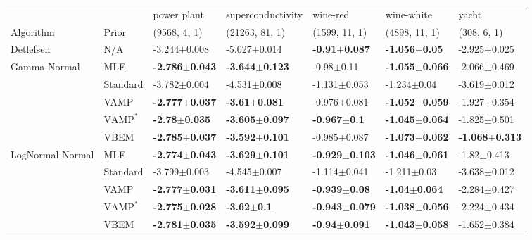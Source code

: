 \begin{tabular}{lllllll}
\midrule
                 &      &                power plant &          superconductivity &                   wine-red &                 wine-white &                      yacht \\
Algorithm & Prior& (9568, 4, 1)& (21263, 81, 1)& (1599, 11, 1)& (4898, 11, 1)& (308, 6, 1)\\
\midrule
Detlefsen & N/A &           -3.244$\pm$0.008 &           -5.027$\pm$0.014 &   \textbf{-0.91$\pm$0.087} &   \textbf{-1.056$\pm$0.05} &           -2.925$\pm$0.025 \\
Gamma-Normal & MLE &  \textbf{-2.786$\pm$0.043} &  \textbf{-3.644$\pm$0.123} &             -0.98$\pm$0.11 &  \textbf{-1.055$\pm$0.066} &           -2.066$\pm$0.469 \\
                 & Standard &           -3.782$\pm$0.004 &           -4.531$\pm$0.008 &           -1.131$\pm$0.053 &            -1.234$\pm$0.04 &           -3.619$\pm$0.012 \\
                 & VAMP &  \textbf{-2.777$\pm$0.037} &   \textbf{-3.61$\pm$0.081} &           -0.976$\pm$0.081 &  \textbf{-1.052$\pm$0.059} &           -1.927$\pm$0.354 \\
                 & $\text{VAMP}^*$ &   \textbf{-2.78$\pm$0.035} &  \textbf{-3.605$\pm$0.097} &    \textbf{-0.967$\pm$0.1} &  \textbf{-1.045$\pm$0.064} &           -1.825$\pm$0.501 \\
                 & VBEM &  \textbf{-2.785$\pm$0.037} &  \textbf{-3.592$\pm$0.101} &           -0.985$\pm$0.087 &  \textbf{-1.073$\pm$0.062} &  \textbf{-1.068$\pm$0.313} \\
LogNormal-Normal & MLE &  \textbf{-2.774$\pm$0.043} &  \textbf{-3.629$\pm$0.101} &  \textbf{-0.929$\pm$0.103} &  \textbf{-1.046$\pm$0.061} &            -1.82$\pm$0.413 \\
                 & Standard &           -3.799$\pm$0.003 &           -4.545$\pm$0.007 &           -1.114$\pm$0.041 &            -1.211$\pm$0.03 &           -3.638$\pm$0.012 \\
                 & VAMP &  \textbf{-2.777$\pm$0.031} &  \textbf{-3.611$\pm$0.095} &   \textbf{-0.939$\pm$0.08} &   \textbf{-1.04$\pm$0.064} &           -2.284$\pm$0.427 \\
                 & $\text{VAMP}^*$ &  \textbf{-2.775$\pm$0.028} &     \textbf{-3.62$\pm$0.1} &  \textbf{-0.943$\pm$0.079} &  \textbf{-1.038$\pm$0.056} &           -2.224$\pm$0.434 \\
                 & VBEM &  \textbf{-2.781$\pm$0.035} &  \textbf{-3.592$\pm$0.099} &   \textbf{-0.94$\pm$0.091} &  \textbf{-1.043$\pm$0.058} &           -1.652$\pm$0.384 \\
\bottomrule
\end{tabular}


